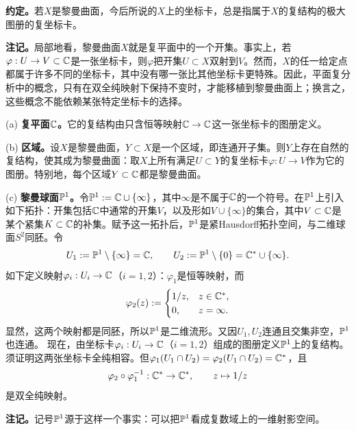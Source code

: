 \textbf{约定。}若$X$是黎曼曲面，今后所说的$X$上的坐标卡，总是指属于$X$的复结构的极大图册的复坐标卡。

\textbf{注记。}局部地看，黎曼曲面$X$就是复平面中的一个开集。事实上，若$\varphi:U\to V\subset\mathbb C$是一张坐标卡，则$\varphi$把开集$U\subset X$双射到$V$。然而，$X$的任一给定点都属于许多不同的坐标卡，其中没有哪一张比其他坐标卡更特殊。因此，平面复分析中的概念，只有在双全纯映射下保持不变时，才能移植到黎曼曲面上；换言之，这些概念不能依赖某张特定坐标卡的选择。

(a) \textbf{复平面$\mathbb C$。}它的复结构由只含恒等映射$\mathbb C\to\mathbb C$这一张坐标卡的图册定义。

(b) \textbf{区域。}设$X$是黎曼曲面，$Y\subset X$是一个区域，即连通开子集。则$Y$上存在自然的复结构，使其成为黎曼曲面：取$X$上所有满足$U\subset Y$的复坐标卡$\varphi:U\to V$作为它的图册。特别地，每个区域$Y\subset\mathbb C$都是黎曼曲面。

(c) \textbf{黎曼球面$\mathbb P^1$。}令$\mathbb P^1:=\mathbb C\cup\{\infty\}$，其中$\infty$是不属于$\mathbb C$的一个符号。在$\mathbb P^1$上引入如下拓扑：开集包括$\mathbb C$中通常的开集$V$，以及形如$V\cup\{\infty\}$的集合，其中$V\subset\mathbb C$是某个紧集$K\subset\mathbb C$的补集。赋予这一拓扑后，$\mathbb P^1$是紧Hausdorff拓扑空间，与二维球面$S^2$同胚。令
\[
U_1:=\mathbb P^1\setminus\{\infty\}=\mathbb C,\qquad U_2:=\mathbb P^1\setminus\{0\}=\mathbb C^*\cup\{\infty\}.
\]
如下定义映射$\varphi_i:U_i\to\mathbb C$（$i=1,2$）：$\varphi_1$是恒等映射，而
\[
\varphi_2(z):=\begin{cases}1/z,&z\in\mathbb C^*,\\0,&z=\infty.\end{cases}
\]
显然，这两个映射都是同胚，所以$\mathbb P^1$是二维流形。又因$U_1,U_2$连通且交集非空，$\mathbb P^1$也连通。
现在，由坐标卡$\varphi_i:U_i\to\mathbb C$（$i=1,2$）组成的图册定义$\mathbb P^1$上的复结构。须证明这两张坐标卡全纯相容。但$\varphi_1(U_1\cap U_2)=\varphi_2(U_1\cap U_2)=\mathbb C^*$，且
\[
\varphi_2\circ\varphi_1^{-1}:\mathbb C^*\to\mathbb C^*,\qquad z\mapsto1/z
\]
是双全纯映射。

\textbf{注记。}记号$\mathbb P^1$源于这样一个事实：可以把$\mathbb P^1$看成复数域上的一维射影空间。

